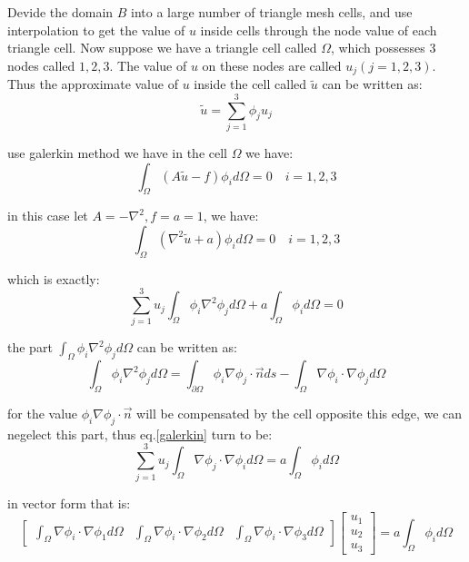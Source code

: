 Devide the domain $B$ into a large number of triangle mesh cells, 
and use interpolation to get the value of $u$ inside cells through the 
node value of each triangle cell. 
Now suppose we have a triangle cell called $\Omega$, which possesses $3$ nodes called 
$1,2,3$. 
The value of $u$ on these nodes are called $u_j(j=1,2,3)$.
Thus the approximate value of $u$ inside the cell called $\tilde{u}$ can be written as:
\begin{equation}
    \tilde{u}=\sum_{j=1}^3 \phi_j u_j
\end{equation}

use galerkin method we have in the cell $\Omega$ we have:
\begin{equation}
    \int_\Omega (A\tilde{u}-f) \phi_i d\Omega  = 0\quad i=1,2,3
\end{equation}

in this case let $A=-\nabla^2,f=a=1$, we have:
\begin{equation}
    \int_\Omega (\nabla^2\tilde{u} + a)\phi_i d\Omega=0 \quad i=1,2,3
\end{equation}

which is exactly:
\begin{equation}
    \sum_{j=1}^3 u_j\int_\Omega \phi_i\nabla^2\phi_j d\Omega
    +
    a\int_\Omega \phi_i d\Omega = 0
\end{equation}

the part $\int_\Omega \phi_i\nabla^2\phi_jd\Omega$ can be written as:
\begin{equation}
    \label{galerkin}
    \int_\Omega \phi_i\nabla^2\phi_jd\Omega
    =
    \int_{\partial \Omega}\phi_i\nabla \phi_j\cdot \vec{n}ds-
    \int_\Omega \nabla\phi_i\cdot\nabla\phi_j d\Omega
\end{equation}

for the value $\phi_i\nabla\phi_j\cdot\vec{n}$ will be compensated by the cell 
opposite this edge, we can negelect this part, thus eq.\ref{galerkin} turn to be:
\begin{equation}
    \sum_{j=1}^3
    u_j
    \int_{\Omega}\nabla\phi_j\cdot\nabla\phi_i d\Omega
    =
    a\int_\Omega \phi_i d\Omega
\end{equation}

in vector form that is:
\begin{equation}
    \begin{bmatrix}
        \int_\Omega\nabla\phi_i\cdot\nabla \phi_1d\Omega
        &
        \int_\Omega\nabla\phi_i\cdot\nabla \phi_2d\Omega
        &
        \int_\Omega\nabla\phi_i\cdot\nabla \phi_3d\Omega
    \end{bmatrix}
    \begin{bmatrix}
        u_1\\u_2\\u_3
    \end{bmatrix}=
    a\int_\Omega \phi_i d\Omega
\end{equation}

